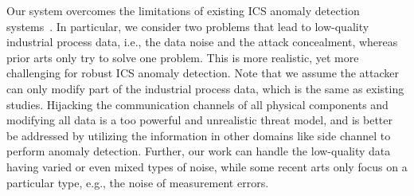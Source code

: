 

Our system overcomes the limitations of existing ICS anomaly detection systems~\cite{aoudi2018truth,zhang2023unsupervised,feng2019systematic,fungattributions,feng2021time,alsaedi2022usmd,kravchik2021efficient,erba2022assessing,tuli2022tranad,abdelaty2020aads,abdelaty2021daics}. In particular, we consider two problems that lead to low-quality industrial process data, i.e., the data noise and the attack concealment, whereas prior arts only try to solve one problem. This is more realistic, yet more challenging for robust ICS anomaly detection. Note that we assume the attacker can only modify part of the industrial process data, which is the same as existing studies. Hijacking the communication channels of all physical components and modifying all data is a too powerful and unrealistic threat model, and is better be addressed by utilizing the information in other domains like side channel to perform anomaly detection. Further, our work can handle the low-quality data having varied or even mixed types of noise, while some recent arts only focus on a particular type, e.g., the noise of measurement errors. 